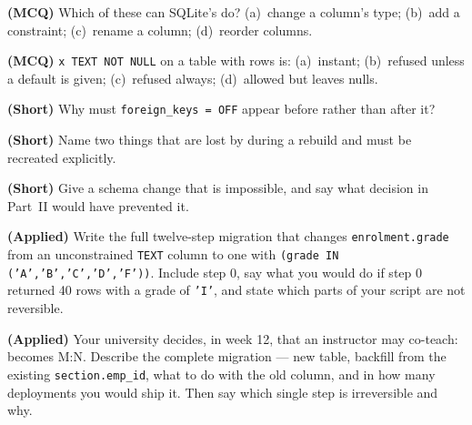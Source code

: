 \begin{reviewq}
  \item \textbf{(MCQ)} Which of these can SQLite's  do?
        (a)~change a column's type; (b)~add a  constraint;
        (c)~rename a column; (d)~reorder columns.
  \item \textbf{(MCQ)}  \texttt{x TEXT NOT NULL} on a table
        with rows is: (a)~instant; (b)~refused unless a default is given;
        (c)~refused always; (d)~allowed but leaves nulls.
  \item \textbf{(Short)} Why must  \texttt{foreign\_keys = OFF}
        appear before  rather than after it?
  \item \textbf{(Short)} Name two things that are lost by 
        during a rebuild and must be recreated explicitly.
  \item \textbf{(Short)} Give a schema change that is impossible, and say what
        decision in Part~II would have prevented it.
  \item \textbf{(Applied)} Write the full twelve-step migration that changes
        \texttt{enrolment.grade} from an unconstrained \texttt{TEXT} column to
        one with  \texttt{(grade IN ('A','B','C','D','F'))}.
        Include step 0, say what you would do if step 0 returned 40 rows with
        a grade of \texttt{'I'}, and state which parts of your script are not
        reversible.
  \item \textbf{(Applied)} Your university decides, in week 12, that an
        instructor may co-teach:  becomes M:N. Describe the
        complete migration --- new table, backfill from the existing
        \texttt{section.emp\_id}, what to do with the old column, and in how
        many deployments you would ship it. Then say which single step is
        irreversible and why.
\end{reviewq}
